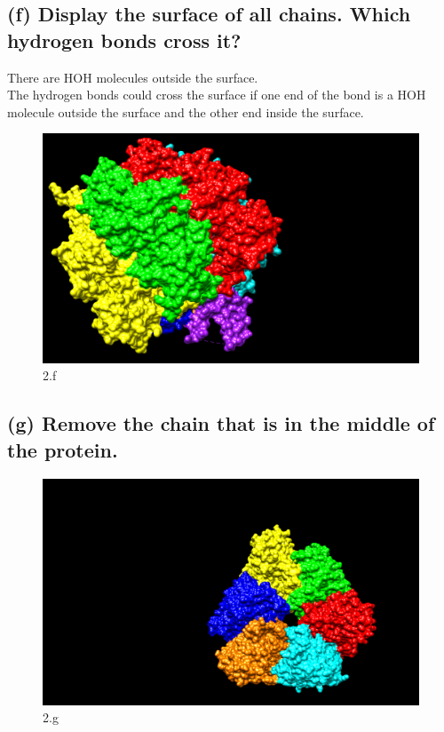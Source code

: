 \documentclass[a4paper, 12pt, one column]{article}
\begin{document}
\subsection*{(f) Display the surface of all chains. Which hydrogen bonds cross it?}
There are HOH molecules outside the surface.\\
The hydrogen bonds could cross the surface if one end of the bond is a HOH molecule outside the surface and the other end inside the surface. 
\begin{figure}[H]
    \centering
    \includegraphics[width=.8\linewidth]{2_f.png}
    \caption{2.f}
    \label{fig:2_f.png}
\end{figure}
\subsection*{(g) Remove the chain that is in the middle of the protein.}
\begin{figure}[H]
    \centering
    \includegraphics[width=.8\linewidth]{2_g.png}
    \caption{2.g}
    \label{fig:2_g.png}
\end{figure}
\end{document}
